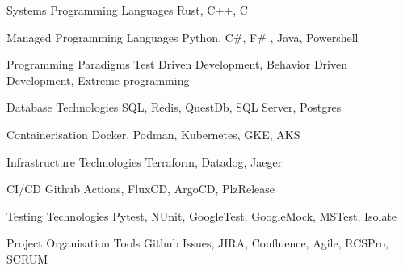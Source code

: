 

\begin{cvskills}

  \cvskill
    {Systems Programming Languages} %
    {Rust, C++, C} %


  \cvskill
    {Managed Programming Languages} %
    {Python, C\#, F\# , Java, Powershell} %

\cvskill
  {Programming Paradigms} %
  {Test Driven Development, Behavior Driven Development, Extreme programming} %


  \cvskill
    {Database Technologies} %
    {SQL, Redis, QuestDb, SQL Server, Postgres} %


  \cvskill
    {Containerisation} %
    {Docker, Podman, Kubernetes, GKE, AKS} %

  \cvskill
    {Infrastructure Technologies} %
    {Terraform, Datadog, Jaeger} %

  \cvskill
  {CI/CD} %
  {Github Actions, FluxCD, ArgoCD, PlzRelease} %

  \cvskill
    {Testing Technologies} %
    {Pytest, NUnit, GoogleTest, GoogleMock, MSTest, Isolate} %

  \cvskill
    {Project Organisation Tools} %
    {Github Issues, JIRA, Confluence, Agile, RCSPro, SCRUM} %

\end{cvskills}
